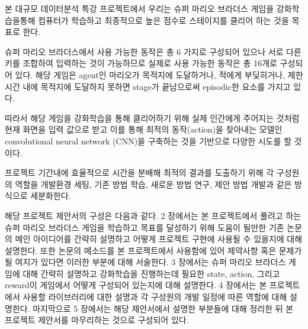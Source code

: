 본 대규모 데이터분석 특강 프로젝트에서 우리는 슈퍼 마리오 브라더스 게임을 강화학습을통해 컴퓨터가 학습하고 최종적으로 높은 점수로 스테이지를 클리어 하는 것을 목표로 한다.

슈퍼 마리오 브라더스에서 사용 가능한 동작은 총 6 가지로 구성되어 있으나 서로 다른 키를 조합하여 입력하는 것이 가능하므로 실제로 사용 가능한 동작은 총 16개로 구성되어 있다. 해당 게임은 agent인 마리오가 목적지에 도달하거나, 적에게 부딪히거나, 제한 시간 내에 목적지에 도달하지 못하면 stage가 끝남으로써 episodic한 요소를 가지고 있다. 

따라서 해당 게임을 강화학습을 통해 클리어하기 위해 실제 인간에게 주어지는 것처럼 현재 화면을 입력 값으로 받고 이를 통해 최적의 동작(action)을 찾아내는 모델인 convolutional neural network (CNN)을 구축하는 것을 기반으로 다양한 시도를 할 것이다.

프로젝트 기간내에 효율적으로 시간을 분배해 최적의 결과를 도출하기 위해 각 구성원의 역할을 개발환경 세팅, 기존 방법 학습, 새로운 방법 연구, 제안 방법 개발과 같은 방식으로 세분화한다.

해당 프로젝트 제안서의 구성은 다음과 같다. 
2 장에서는 본 프로젝트에서 풀려고 하는 슈퍼 마리오 브라더스 게임을 학습하고 목표를 달성하기 위해 도움이 될만한 기존 논문의 메인 아이디어를 간략히 설명하고 어떻게 프로젝트 구현에 사용될 수 있을지에 대해 설명한다. 
또한 논문의 메소드를 본 프로젝트에서 사용함에 있어 제약사항 혹은 문제가 될 여지가 있다면 이러한 부분에 대해 서술한다. 
3 장에서는 슈퍼 마리오 브라더스 게임에 대해 간략히 설명하고 강화학습을 진행하는데 필요한 state, action, 그리고 reward이 게임에서 어떻게 구성되어 있는지에 대해 설명한다. 
4 장에서는 본 프로젝트에서 사용할 라이브러리에 대한 설명과 각 구성원의 개발 일정에 따른 역할에 대해 설명한다. 
마지막으로 5 장에서는 해당 제안서에서 설명한 부분들에 대해 정리한 뒤 본 프로젝트 제안서를 마무리하는 것으로 구성되어 있다.